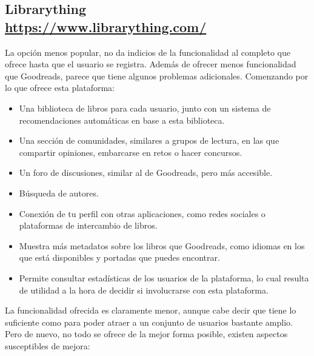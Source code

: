 \subsection[Librarything]{Librarything\\ {\large \url{https://www.librarything.com/}}}

La opción menos popular, no da indicios de la funcionalidad al completo que ofrece hasta que el usuario se registra. Además de ofrecer menos funcionalidad que Goodreads, parece que tiene algunos problemas adicionales. Comenzando por lo que ofrece esta plataforma:

\begin{itemize}
\item Una biblioteca de libros para cada usuario, junto con un sistema de recomendaciones automáticas en base a esta biblioteca.
\item Una sección de comunidades, similares a grupos de lectura, en las que compartir opiniones, embarcarse en retos o hacer concursos.
\item Un foro de discusiones, similar al de Goodreads, pero más accesible.
\item Búsqueda de autores.
\item Conexión de tu perfil con otras aplicaciones, como redes sociales o plataformas de intercambio de libros.
\item Muestra más metadatos sobre los libros que Goodreads, como idiomas en los que está disponibles y portadas que puedes encontrar.
\item Permite consultar estadísticas de los usuarios de la plataforma, lo cual resulta de utilidad a la hora de decidir si involucrarse con esta plataforma.
\end{itemize}

La funcionalidad ofrecida es claramente menor, aunque cabe decir que tiene lo suficiente como para poder atraer a un conjunto de usuarios bastante amplio. Pero de nuevo, no todo se ofrece de la mejor forma posible, existen aspectos susceptibles de mejora:

